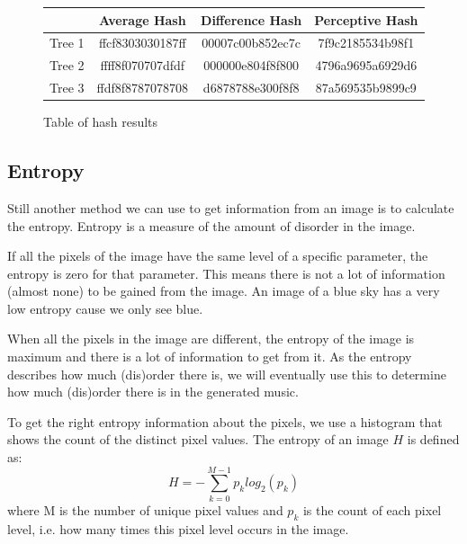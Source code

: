 \documentclass[12pt]{article}
\begin{document}
\begin{figure}
\centering
\begin{tabular}{| c | c | c | c |}
\hline
& \textbf{Average Hash} & \textbf{Difference Hash} & \textbf{Perceptive Hash} \\
\hline
Tree 1 & ffcf8303030187ff & 00007c00b852ec7c & 7f9c2185534b98f1 \\ 
\hline
Tree 2 & ffff8f070707dfdf & 000000e804f8f800 &  4796a9695a6929d6 \\
\hline
Tree 3 & ffdf8f8787078708 & d6878788e300f8f8 & 87a569535b9899c9 \\
\hline
\end{tabular}
\caption{Table of hash results}
\label{hashtable}
\end{figure}

\subsection{Entropy}

Still another method we can use to get information from an image is to calculate the entropy.
Entropy is a measure of the amount of disorder in the image.
\newline

If all the pixels of the image have the same level of a specific parameter, the entropy is zero for that parameter. This means there is not a lot of information (almost none) to be gained from the image. An image of a blue sky has a very low entropy cause we only see blue. 
\newline

When all the pixels in the image are different, the entropy of the image is maximum and there is a lot of information to get from it. As the entropy describes how much (dis)order there is, we will eventually use this to determine how much (dis)order there is in the generated music.
\newline

To get the right entropy information about the pixels, we use a histogram that shows the count of the distinct pixel values. The entropy of an image $H$ is defined as:
\begin{equation}
H = - \sum_{k=0}^{M-1} p_k log_2 (p_k)
\end{equation}
\newline
where M is the number of unique pixel values and $p_k$ is the count of each pixel level, i.e. how many times this pixel level occurs in the image.
\newline
\end{document}
